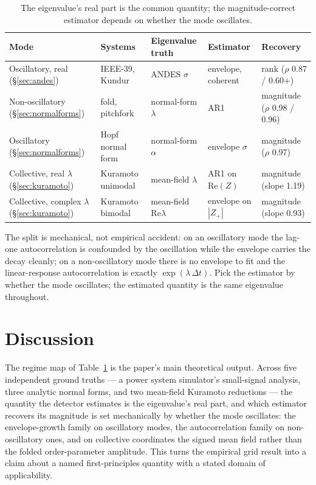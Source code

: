 \documentclass[aip,cha,preprint,amsmath,amssymb]{revtex4-2}
\begin{document}
\begin{table}[t]
\centering
\scriptsize
\setlength{\tabcolsep}{3pt}
\begin{tabular}{lllll}
\toprule
Mode & Systems & Eigenvalue truth & Estimator & Recovery \\
\midrule
Oscillatory, real (\S\ref{sec:andes}) & IEEE-39, Kundur & ANDES $\sigma$ & envelope, coherent & rank ($\rho$ 0.87 / 0.60+) \\
Non-oscillatory (\S\ref{sec:normalforms}) & fold, pitchfork & normal-form $\lambda$ & AR1 & magnitude ($\rho$ 0.98 / 0.96) \\
Oscillatory (\S\ref{sec:normalforms}) & Hopf normal form & normal-form $\alpha$ & envelope $\sigma$ & magnitude ($\rho$ 0.97) \\
Collective, real $\lambda$ (\S\ref{sec:kuramoto}) & Kuramoto unimodal & mean-field $\lambda$ & AR1 on $\mathrm{Re}(Z)$ & magnitude (slope 1.19) \\
Collective, complex $\lambda$ (\S\ref{sec:kuramoto}) & Kuramoto bimodal & mean-field $\mathrm{Re}\lambda$ & envelope on $|Z_+|$ & magnitude (slope 0.93) \\
\bottomrule
\end{tabular}
\caption{The eigenvalue's real part is the common quantity; the
magnitude-correct estimator depends on whether the mode oscillates.}
\label{tab:regimemap}
\end{table}

The split is mechanical, not empirical accident: on an oscillatory mode
the lag-one autocorrelation is confounded by the oscillation while the
envelope carries the decay cleanly; on a non-oscillatory mode there is
no envelope to fit and the linear-response autocorrelation is exactly
$\exp(\lambda\,\Delta t)$. Pick the estimator by whether the mode
oscillates; the estimated quantity is the same eigenvalue throughout.

\section{Discussion}\label{sec:discussion}

The regime map of Table~\ref{tab:regimemap} is the paper's main
theoretical output. Across five independent ground truths --- a power
system simulator's small-signal analysis, three analytic normal forms,
and two mean-field Kuramoto reductions --- the quantity the detector
estimates is the eigenvalue's real part, and which estimator recovers
its magnitude is set mechanically by whether the mode oscillates: the
envelope-growth family on oscillatory modes, the autocorrelation family
on non-oscillatory ones, and on collective coordinates the signed mean
field rather than the folded order-parameter amplitude. This turns the
empirical grid result into a claim about a named first-principles
quantity with a stated domain of applicability.
\end{document}
